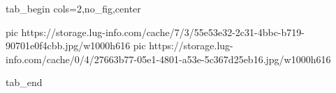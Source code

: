  
 
 
 
 


\ifcmt
  tab_begin cols=2,no_fig,center

     pic https://storage.lug-info.com/cache/7/3/55e53e32-2c31-4bbc-b719-90701e0f4cbb.jpg/w1000h616%
		 pic https://storage.lug-info.com/cache/0/4/27663b77-05e1-4801-a53e-5c367d25eb16.jpg/w1000h616%

  tab_end
\fi
